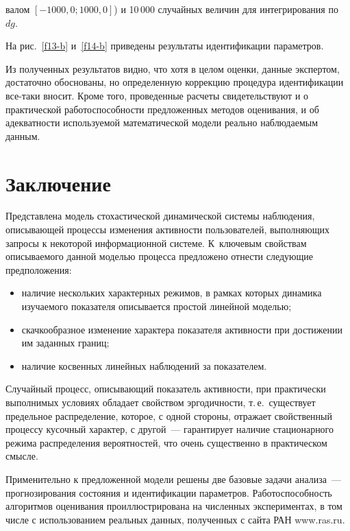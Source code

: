 \begin{multicols}{2}
\addtocounter{table}{2}


\noindent
валом $[-1000{,}0; 1000{,}0]$) и 10\,000 случайных величин для интегрирования по~$dg$.

На рис.~\ref{f13-b} и~\ref{f14-b} приведены результаты идентификации параметров.

  Из полученных результатов видно, что хотя в целом оценки, данные экспертом, 
достаточно обос\-но\-ва\-ны, но определенную коррекцию процедура идентификации все-таки 
вносит. Кроме того, проведенные расчеты свидетельствуют и о практической 
работоспособности предложенных методов оценивания, и об адекватности используемой 
математической модели реально наблюдаемым данным.

\vspace*{-6pt}

\section{Заключение}

\vspace*{-2pt}
  
  Представлена модель стохастической динамической сис\-те\-мы наблюдения, описывающей 
процес\-сы изменения активности пользователей, выполняющих запросы к некоторой 
информационной сис\-те\-ме. К~ключевым свойствам описываемого данной моделью процесса 
предложено отнести сле\-ду\-ющие предположения:
  \begin{itemize}
\item наличие нескольких характерных режимов, в рамках которых динамика изучаемого 
показателя описывается простой линейной моделью;
\item скачкообразное изменение характера показателя активности при достижении им 
заданных границ;
\item наличие косвенных линейных наблюдений за показателем.
\end{itemize}

  Случайный процесс, описывающий показатель активности, при практически выполнимых 
условиях обладает свойством эргодичности, т.\,е.\ существует предельное распределение, 
которое, с одной стороны, отражает свойственный процессу кусочный характер, с другой~--- 
гарантирует наличие стационарного режима распределения вероятностей, что очень 
существенно в практическом смысле.
  
  Применительно к предложенной модели решены две базовые задачи анализа~--- 
прогнозирования состояния и идентификации параметров. Работоспособность алгоритмов 
оценивания проиллюстрирована на численных экспериментах, в том числе с использованием 
реальных данных, полученных с сайта РАН {\sf www.ras.ru}.
  

\end{multicols}
